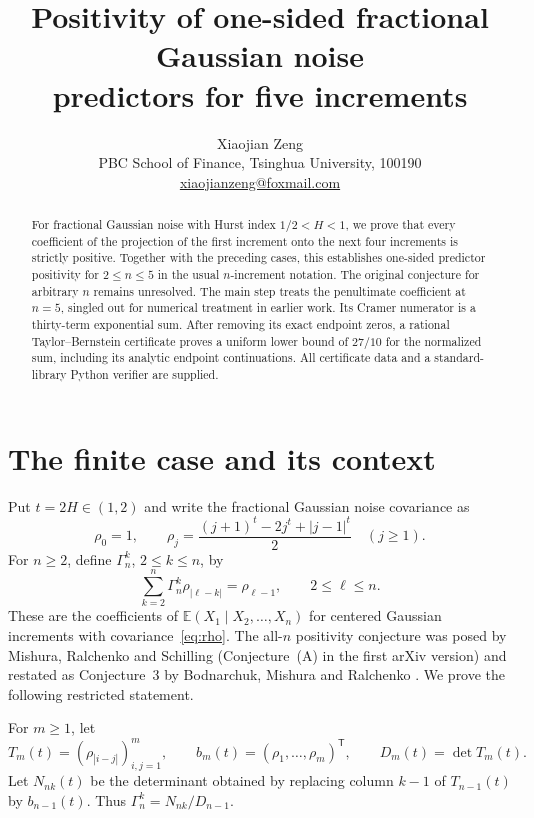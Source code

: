 \documentclass[11pt]{article}
\title{Positivity of one-sided fractional Gaussian noise\protect\\ predictors for five increments}
\author{Xiaojian Zeng\\
  \small PBC School of Finance, Tsinghua University, 100190\\
  \small \href{mailto:xiaojianzeng@foxmail.com}{xiaojianzeng@foxmail.com}}
\date{}
\newcommand{\E}{\mathbb{E}}
\begin{document}
\maketitle

\begin{abstract}
For fractional Gaussian noise with Hurst index $1/2<H<1$, we prove that
every coefficient of the projection of the first increment onto the next
four increments is strictly positive. Together with the preceding cases,
this establishes one-sided predictor positivity for $2\le n\le5$ in the
usual $n$-increment notation. The original conjecture for arbitrary $n$
remains unresolved. The main step treats the penultimate coefficient at
$n=5$, singled out for numerical treatment in earlier work. Its Cramer
numerator is a thirty-term exponential sum. After removing its exact
endpoint zeros, a rational Taylor--Bernstein certificate proves a uniform
lower bound of $27/10$ for the normalized sum, including its analytic
endpoint continuations. All certificate data and a standard-library
Python verifier are supplied.
\end{abstract}

\section{The finite case and its context}

Put $t=2H\in(1,2)$ and write the fractional Gaussian noise covariance as
\begin{equation}\label{eq:rho}
 \rho_0=1,\qquad
 \rho_j=\frac{(j+1)^t-2j^t+|j-1|^t}{2}\quad(j\ge1).
\end{equation}
For $n\ge2$, define $\Gamma_n^k$, $2\le k\le n$, by
\begin{equation}\label{eq:normal}
 \sum_{k=2}^{n}\Gamma_n^k\rho_{|\ell-k|}=\rho_{\ell-1},
 \qquad 2\le\ell\le n.
\end{equation}
These are the coefficients of $\E(X_1\mid X_2,\ldots,X_n)$ for centered
Gaussian increments with covariance~\eqref{eq:rho}. The all-$n$ positivity
conjecture was posed by Mishura, Ralchenko and Schilling
\cite{Mishura2022} (Conjecture~(A) in the first arXiv version) and restated
as Conjecture~3 by Bodnarchuk, Mishura and Ralchenko
\cite{Bodnarchuk2025}. We prove the following restricted statement.

For $m\ge1$, let
\[
 T_m(t)=(\rho_{|i-j|})_{i,j=1}^{m},\qquad
 b_m(t)=(\rho_1,\ldots,\rho_m)^{\mathsf T},\qquad D_m(t)=\det T_m(t).
\]
Let $N_{nk}(t)$ be the determinant obtained by replacing column $k-1$
of $T_{n-1}(t)$ by $b_{n-1}(t)$. Thus $\Gamma_n^k=N_{nk}/D_{n-1}$.
\end{document}
